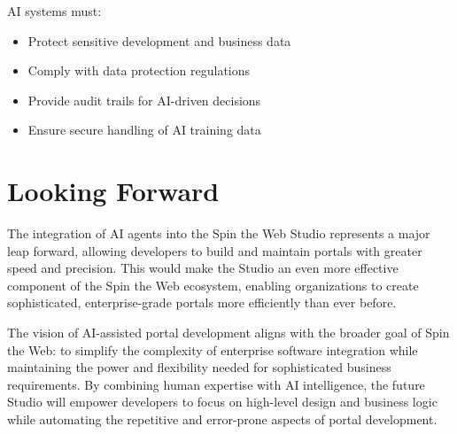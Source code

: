 AI systems must:
\begin{itemize}
\item Protect sensitive development and business data
\item Comply with data protection regulations
\item Provide audit trails for AI-driven decisions
\item Ensure secure handling of AI training data
\end{itemize}

\section{Looking Forward}
\label{sec:ai-future}

The integration of AI agents into the Spin the Web Studio represents a major leap forward, allowing developers to build and maintain portals with greater speed and precision. This would make the Studio an even more effective component of the Spin the Web ecosystem, enabling organizations to create sophisticated, enterprise-grade portals more efficiently than ever before.

The vision of AI-assisted portal development aligns with the broader goal of Spin the Web: to simplify the complexity of enterprise software integration while maintaining the power and flexibility needed for sophisticated business requirements. By combining human expertise with AI intelligence, the future Studio will empower developers to focus on high-level design and business logic while automating the repetitive and error-prone aspects of portal development.
